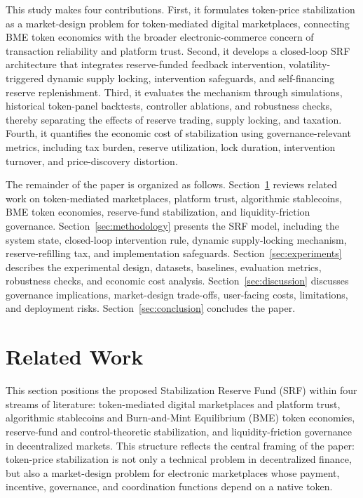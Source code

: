 \documentclass[a4paper,fleqn]{cas-dc}
\begin{document}
This study makes four contributions. First, it formulates token-price stabilization as a market-design problem for token-mediated digital marketplaces, connecting BME token economics with the broader electronic-commerce concern of transaction reliability and platform trust. Second, it develops a closed-loop SRF architecture that integrates reserve-funded feedback intervention, volatility-triggered dynamic supply locking, intervention safeguards, and self-financing reserve replenishment. Third, it evaluates the mechanism through simulations, historical token-panel backtests, controller ablations, and robustness checks, thereby separating the effects of reserve trading, supply locking, and taxation. Fourth, it quantifies the economic cost of stabilization using governance-relevant metrics, including tax burden, reserve utilization, lock duration, intervention turnover, and price-discovery distortion.

The remainder of the paper is organized as follows. 
Section~\ref{sec:relatedwork} reviews related work on token-mediated marketplaces, platform trust, algorithmic stablecoins, BME token economies, reserve-fund stabilization, and liquidity-friction governance. 
Section~\ref{sec:methodology} presents the SRF model, including the system state, closed-loop intervention rule, dynamic supply-locking mechanism, reserve-refilling tax, and implementation safeguards. 
Section~\ref{sec:experiments} describes the experimental design, datasets, baselines, evaluation metrics, robustness checks, and economic cost analysis. 
Section~\ref{sec:discussion} discusses governance implications, market-design trade-offs, user-facing costs, limitations, and deployment risks. 
Section~\ref{sec:conclusion} concludes the paper.

\section{Related Work}
\label{sec:relatedwork}

This section positions the proposed Stabilization Reserve Fund (SRF) within four streams of literature: token-mediated digital marketplaces and platform trust, algorithmic stablecoins and Burn-and-Mint Equilibrium (BME) token economies, reserve-fund and control-theoretic stabilization, and liquidity-friction governance in decentralized markets. This structure reflects the central framing of the paper: token-price stabilization is not only a technical problem in decentralized finance, but also a market-design problem for electronic marketplaces whose payment, incentive, governance, and coordination functions depend on a native token.
\end{document}
